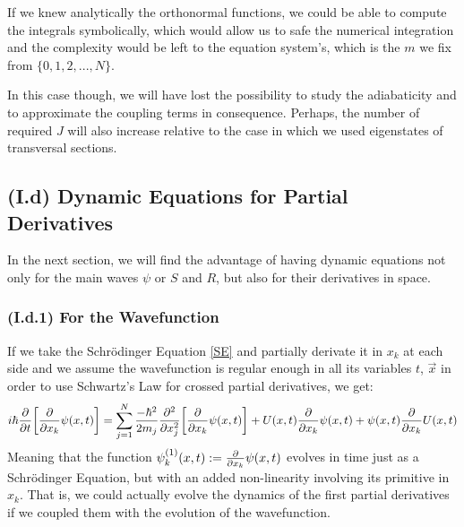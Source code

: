 \documentclass[11pt, a4paper]{article} %
\begin{document}
If we knew analytically the orthonormal functions, we could be able to compute the integrals symbolically, which would allow us to safe the numerical integration and the complexity would be left to the equation system's, which is the $m$ we fix from $\{0,1,2,...,N\}$.

In this case though, we will have lost the possibility to study the adiabaticity and to approximate the coupling terms in consequence. Perhaps, the number of required $J$ will also increase relative to the case in which we used eigenstates of transversal sections.



\subsection*{(I.d) Dynamic Equations for Partial Derivatives}
In the next section, we will find the advantage of having dynamic equations not only for the main waves $\psi$ or $S$ and $R$, but also for their derivatives in space.

\subsubsection*{(I.d.1) For the Wavefunction}
If we take the Schrödinger Equation \eqref{SE} and partially derivate it in $x_k$ at each side and we assume the wavefunction is regular enough in all its variables $t$, $\vec{x}$ in order to use Schwartz's Law for crossed partial derivatives, we get:
\begin{equation}
i\hbar \pdv{}{t}\qty[\pdv{}{x_k}\psi(x,t)] = \sum_{j=1}^N\frac{-\hbar^2}{2m_j}\pdv[2]{}{x_j}\qty[\pdv{}{x_k}\psi(x,t)]+U(x,t)\pdv{}{x_k}\psi(x,t) + \psi(x,t)\pdv{}{x_k}U(x,t)
\end{equation}
Meaning that the function $\psi^{(1)}_k(x,t):=\pdv{}{x_k}\psi(x,t)$ evolves in time just as a Schrödinger Equation, but with an added non-linearity involving its primitive in $x_k$. That is, we could actually evolve the dynamics of the first partial derivatives if we coupled them with the evolution of the wavefunction.
\end{document}
